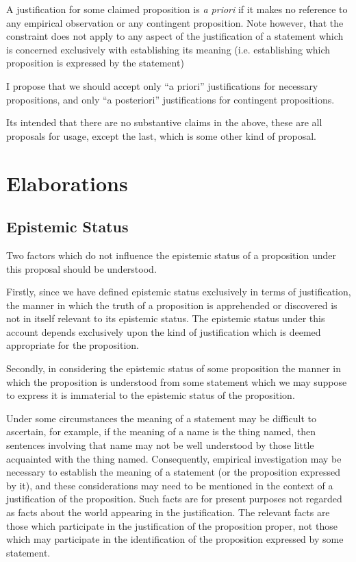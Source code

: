 A justification for some claimed proposition is {\it a priori} if it makes no reference to any empirical observation or any contingent proposition.
Note however, that the constraint does not apply to any aspect of the justification of a statement	which is concerned exclusively with establishing its meaning (i.e. establishing which proposition is expressed by the statement)

I propose that we should accept only ``a priori'' justifications for necessary propositions, and only ``a posteriori'' justifications for contingent propositions.

Its intended that there are no substantive claims in the above, these
are all proposals for usage, except the last, which is some other
kind of proposal.

\section{Elaborations}

\subsection{Epistemic Status}

Two factors which do not influence the epistemic status of a proposition under this proposal should be understood.

Firstly, since we have defined epistemic status exclusively in terms of justification, the manner in which the truth of a proposition is apprehended or discovered is not in itself relevant to its epistemic status.
The epistemic status under this account depends exclusively upon the kind of justification which is deemed appropriate for the proposition.

Secondly, in considering the epistemic status of some proposition the manner in which the proposition is understood from some statement which we may suppose to express it is immaterial to the epistemic status of the proposition.

Under some circumstances the meaning of a statement may be difficult to ascertain, for example, if the meaning of a name is the thing named, then sentences involving that name may not be well understood by those little acquainted with the thing named.
Consequently, empirical investigation may be necessary to establish the meaning of a statement (or the proposition expressed by it), and these considerations may need to be mentioned in the context of a justification of the proposition.
Such facts are for present purposes not regarded as facts about the world appearing in the justification.
The relevant facts are those which participate in the justification of the proposition proper, not those which may participate in the identification of the proposition expressed by some statement.

